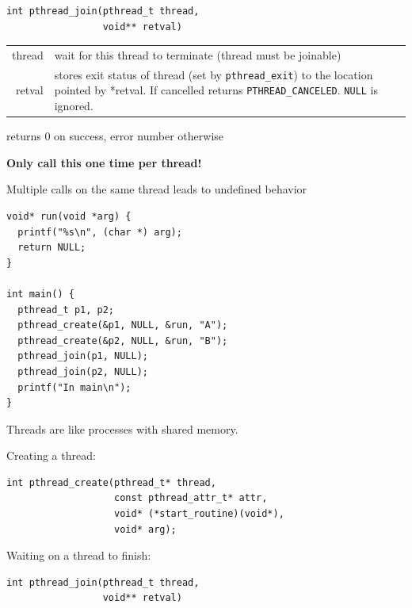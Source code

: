   \begin{slide}


    \begin{verbatim}
int pthread_join(pthread_t thread,
                 void** retval)
    \end{verbatim}
    \medskip

    \begin{tabular}{rp{10cm}}
  thread & wait for this thread to terminate (thread must be joinable) \\

  retval & stores exit status of thread (set by {\tt pthread\_exit}) to
                 the location pointed by *retval. If cancelled returns
                 {\tt PTHREAD\_CANCELED}. {\tt NULL} is ignored. \\
    \end{tabular}

  returns 0 on success, error number otherwise 
  \medskip

  {\bf Only call this one time per thread!}

  \leftspace{}Multiple calls on the same thread leads to undefined behavior

  \end{slide}

	\begin{slide}


		\vspace{-5mm}
		
		\begin{verbatim}
void* run(void *arg) {
  printf("%s\n", (char *) arg);
  return NULL;
}

int main() {
  pthread_t p1, p2;
  pthread_create(&p1, NULL, &run, "A");
  pthread_create(&p2, NULL, &run, "B");
  pthread_join(p1, NULL);
  pthread_join(p2, NULL);
  printf("In main\n");
}
		\end{verbatim}

	\end{slide}
	
	\begin{slide}
	
		\slidetitle{Recap for Yesterday}
		
	Threads are like processes with shared memory.
	\bigskip
	
	Creating a thread:
	\begin{verbatim}
int pthread_create(pthread_t* thread, 
                   const pthread_attr_t* attr,
                   void* (*start_routine)(void*),
                   void* arg);
    \end{verbatim}
    \bigskip
		
	Waiting on a thread to finish:
	\begin{verbatim}
int pthread_join(pthread_t thread,
                 void** retval)
    \end{verbatim}
    \medskip
	
	\end{slide}
	
